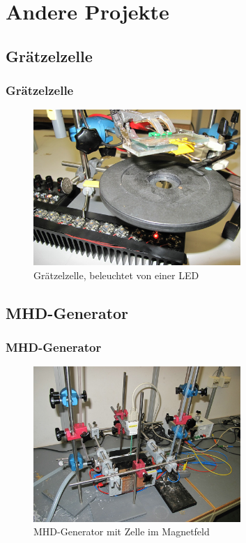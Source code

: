 \documentclass[10pt]{beamer}
\begin{document}
\section{Andere Projekte}
\subsection[]{Gr\"atzelzelle}
\frame
{
\frametitle{Gr\"atzelzelle}
\begin{figure}
\begin{center}
\includegraphics[width=0.7\textwidth]{./images/prIMG_3497.jpg}
\caption{Gr\"atzelzelle, beleuchtet von einer LED}
\end{center}
\end{figure}
}
\subsection[]{MHD-Generator}
\frame
{
\frametitle{MHD-Generator}
\begin{figure}
\begin{center}
\includegraphics[width=0.7\textwidth]{./images/prIMG_3768.jpg}
\caption{MHD-Generator mit Zelle im Magnetfeld}
\end{center}
\end{figure}
}
\end{document}
